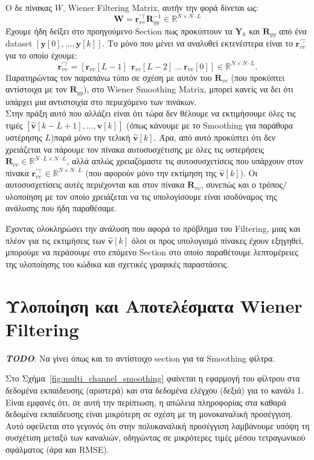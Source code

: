 \documentclass[12pt]{article} %
\begin{document}
Ο δε πίνακας $W$, Wiener Filtering Matrix, αυτήν την φορά δίνεται ως:
\[
\mathbf{W} = \mathbf{r}_{vv}^{' \top}\mathbf{R}_{yy}^{-1} \in \mathbb{R}^{N \times N \cdot L}
\]
Έχουμε ήδη δείξει στο προηγούμενο Section πως προκύπτουν τα $\mathbf{Y}_k$ και $\mathbf{R}_{yy}$ από ένα dataset $[\mathbf{y}[0], \ldots, \mathbf{y}[k]]$. Το μόνο που μένει να αναλυθεί εκτενέστερα είναι το $\mathbf{r}_{vv}^{' \top}$ για το οποίο έχουμε:
\[
\mathbf{r}_{vv}^{' \top} = [\mathbf{r}_{vv}[L-1]\ \ \mathbf{r}_{vv}[L-2] \  \ldots \ \mathbf{r}_{vv}[0]] \in \mathbb{R}^{N \times N \cdot L}.
\]
Παρατηρώντας τον παραπάνω τύπο σε σχέση με αυτόν του $\mathbf{R}_{vv}$ (που προκύπτει αντίστοιχα με τον $\mathbf{R}_{yy}$), στο Wiener Smoothing Matrix, μπορεί κανείς να δει ότι υπάρχει μια αντιστοιχία στο περιεχόμενο των πινάκων. \\ 
Στην πράξη αυτό που αλλάζει είναι ότι τώρα δεν θέλουμε να εκτιμήσουμε όλες τις τιμές $[\hat{\mathbf{v}}[k-L+1], \ldots, \hat{\mathbf{v}}[k]]$ (όπως κάνουμε με το Smoothing για παράθυρα υστέρησης $L$)\textemdash παρά μόνο την τελική $\hat{\mathbf{v}}[k]$. 
Άρα, από αυτό προκύπτει ότι δεν χρειάζεται να πάρουμε τον πίνακα αυτοσυσχέτισης με όλες τις υστερήσεις $\mathbf{R}_{vv} \in \mathbb{R}^{N \cdot L \times N \cdot L}$, αλλά απλώς χρειαζόμαστε τις αυτοσυσχετίσεις που υπάρχουν στον πίνακα $\mathbf{r}_{vv}^{' \top} \in \mathbb{R}^{N \times N \cdot L}$ (που αφορούν μόνο την εκτίμηση της $\hat{\mathbf{v}}[k]$).
Οι αυτοσυσχετίσεις αυτές περιέχονται και στον πίνακα $\mathbf{R}_{vv}$, συνεπώς και ο τρόπος/υλοποίηση με τον οποίο χρειάζεται να τις υπολογίσουμε είναι ισοδύναμος της ανάλυσης που ήδη παραθέσαμε. 

\vspace{+10pt}

Έχοντας ολοκληρώσει την ανάλυση που αφορά το πρόβλημα του Filtering, μιας και πλέον για τις εκτιμήσεις των $\hat{\mathbf{v}}[k]$ όλοι οι προς υπολογισμό πίνακες έχουν εξηγηθεί, μπορούμε να περάσουμε στο επόμενο Section στο οποίο παραθέτουμε λεπτομέρειες της υλοποίησης του κώδικα και σχετικές γραφικές παραστάσεις.

\section*{Υλοποίηση και Αποτελέσματα Wiener Filtering}
\textbf{\textit{TODO}}: Να γίνει όπως και το αντίστοιχο section για τα Smoothing φίλτρα. 

Στο Σχήμα~\ref{fig:multi_channel_smoothing} φαίνεται η εφαρμογή του φίλτρου στα δεδομένα εκπαίδευσης 
(αριστερά) και στα δεδομένα ελέγχου (δεξιά) για το κανάλι 1. Είναι εμφανές ότι, σε αυτή την περίπτωση, 
η απώλεια πληροφορίας στα καθαρά δεδομένα εκπαίδευσης είναι μικρότερη σε σχέση με τη μονοκαναλική προσέγγιση.  
Αυτό οφείλεται στο γεγονός ότι στην πολυκαναλική προσέγγιση λαμβάνουμε υπόψη τη συσχέτιση μεταξύ των καναλιών,  
οδηγώντας σε μικρότερες τιμές μέσου τετραγωνικού σφάλματος (άρα και RMSE).
\end{document}
